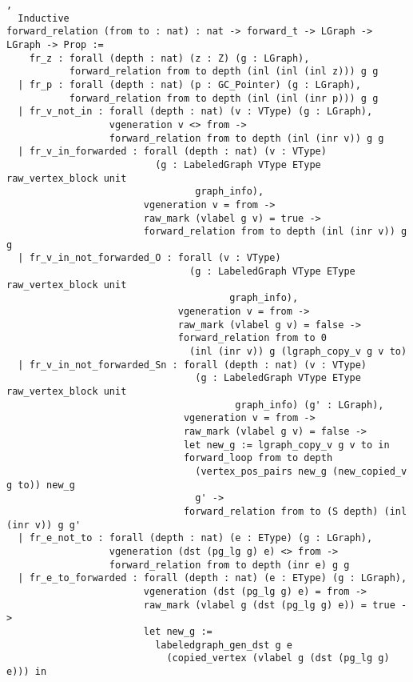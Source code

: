   \begin{lstlisting}[basicstyle=\normalfont\tiny\tt],
  Inductive
forward_relation (from to : nat) : nat -> forward_t -> LGraph -> LGraph -> Prop :=
    fr_z : forall (depth : nat) (z : Z) (g : LGraph),
           forward_relation from to depth (inl (inl (inl z))) g g
  | fr_p : forall (depth : nat) (p : GC_Pointer) (g : LGraph),
           forward_relation from to depth (inl (inl (inr p))) g g
  | fr_v_not_in : forall (depth : nat) (v : VType) (g : LGraph),
                  vgeneration v <> from ->
                  forward_relation from to depth (inl (inr v)) g g
  | fr_v_in_forwarded : forall (depth : nat) (v : VType)
                          (g : LabeledGraph VType EType raw_vertex_block unit
                                 graph_info),
                        vgeneration v = from ->
                        raw_mark (vlabel g v) = true ->
                        forward_relation from to depth (inl (inr v)) g g
  | fr_v_in_not_forwarded_O : forall (v : VType)
                                (g : LabeledGraph VType EType raw_vertex_block unit
                                       graph_info),
                              vgeneration v = from ->
                              raw_mark (vlabel g v) = false ->
                              forward_relation from to 0 
                                (inl (inr v)) g (lgraph_copy_v g v to)
  | fr_v_in_not_forwarded_Sn : forall (depth : nat) (v : VType)
                                 (g : LabeledGraph VType EType raw_vertex_block unit
                                        graph_info) (g' : LGraph),
                               vgeneration v = from ->
                               raw_mark (vlabel g v) = false ->
                               let new_g := lgraph_copy_v g v to in
                               forward_loop from to depth
                                 (vertex_pos_pairs new_g (new_copied_v g to)) new_g
                                 g' ->
                               forward_relation from to (S depth) (inl (inr v)) g g'
  | fr_e_not_to : forall (depth : nat) (e : EType) (g : LGraph),
                  vgeneration (dst (pg_lg g) e) <> from ->
                  forward_relation from to depth (inr e) g g
  | fr_e_to_forwarded : forall (depth : nat) (e : EType) (g : LGraph),
                        vgeneration (dst (pg_lg g) e) = from ->
                        raw_mark (vlabel g (dst (pg_lg g) e)) = true ->
                        let new_g :=
                          labeledgraph_gen_dst g e
                            (copied_vertex (vlabel g (dst (pg_lg g) e))) in

\end{lstlisting}
